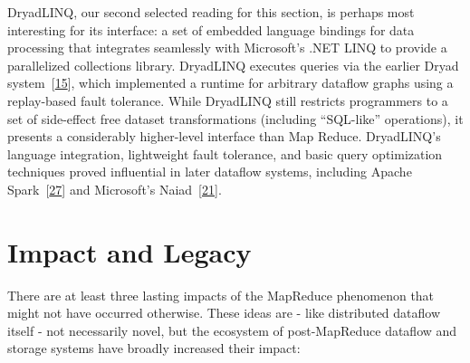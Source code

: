 \documentclass[b5paper,11pt,twoside,openright]{book}
\newcommand\Section[2]{
  \hypertarget{#1}{
    \section{#2}
  }
}
\begin{document}
DryadLINQ, our second selected reading for this section, is perhaps most
interesting for its interface: a set of embedded language bindings for
data processing that integrates seamlessly with Microsoft's .NET LINQ to
provide a parallelized collections library. DryadLINQ executes queries
via the earlier Dryad system~{{[}\protect\hyperlink{ref-dryad}{15}{]}},
which implemented a runtime for arbitrary dataflow graphs using a
replay-based fault tolerance. While DryadLINQ still restricts
programmers to a set of side-effect free dataset transformations
(including ``SQL-like'' operations), it presents a considerably
higher-level interface than Map Reduce. DryadLINQ's language
integration, lightweight fault tolerance, and basic query optimization
techniques proved influential in later dataflow systems, including
Apache Spark~{{[}\protect\hyperlink{ref-spark}{27}{]}} and Microsoft's
Naiad~{{[}\protect\hyperlink{ref-naiad}{21}{]}}.

\Section{impact-and-legacy}{%
Impact and Legacy
}

There are at least three lasting impacts of the MapReduce phenomenon
that might not have occurred otherwise. These ideas are - like
distributed dataflow itself - not necessarily novel, but the ecosystem
of post-MapReduce dataflow and storage systems have broadly increased
their impact:
\end{document}
